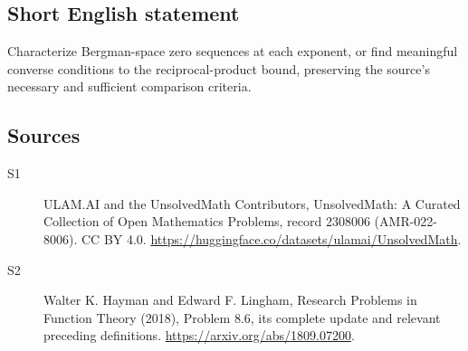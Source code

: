 \documentclass[11pt]{article}
\begin{document}
\subsection{Short English statement}
Characterize Bergman-space zero sequences at each exponent, or find meaningful converse conditions to the reciprocal-product bound, preserving the source’s necessary and sufficient comparison criteria.
\subsection{Sources}
\begin{description}
\item[\hypertarget{source:2308006:1}{S1}] ULAM.AI and the UnsolvedMath Contributors, UnsolvedMath: A Curated Collection of Open Mathematics Problems, record 2308006 (AMR-022-8006). CC BY 4.0. \url{https://huggingface.co/datasets/ulamai/UnsolvedMath}.
\item[\hypertarget{source:2308006:2}{S2}] Walter K. Hayman and Edward F. Lingham, Research Problems in Function Theory (2018), Problem 8.6, its complete update and relevant preceding definitions. \url{https://arxiv.org/abs/1809.07200}.
\end{description}
\label{end:2308006}
\end{document}
